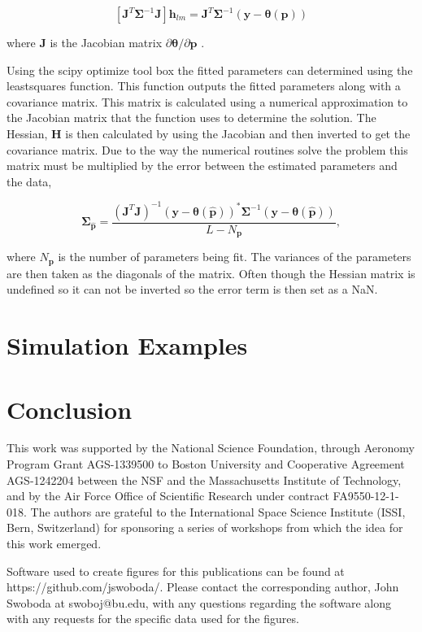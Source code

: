 \documentclass[draft,ras]{agutex}
\begin{document}
\begin{article}
\begin{equation}
\left[ \mathbf{J}^T\bm{\Sigma}^{-1}\mathbf{J}\right]\mathbf{h}_{lm} =\mathbf{J}^T\bm{\Sigma}^{-1}(\mathbf{y}-\bm{\theta}(\mathbf{p}))
\label{hlm}
\end{equation}

\noindent where $\mathbf{J}$ is the Jacobian matrix $\partial \bm{\theta}/\partial \mathbf{p}$ \citep{levenberg1944,marquardt:1963}. 

Using the scipy optimize tool box the fitted parameters can determined using the leastsquares function. This function outputs the fitted parameters along with a covariance matrix. This matrix is calculated using a numerical approximation to the Jacobian matrix that the function uses to determine the solution. The Hessian, $\mathbf{H}$ is then calculated by using the Jacobian and then inverted to get the covariance matrix. Due to the way the numerical routines solve the problem this matrix must be multiplied by the error between the estimated parameters and the data,

\begin{equation}
\label{eqn:jacinv}
\bm{\Sigma}_{\hat{\mathbf{p}}}=\frac{(\mathbf{J}^T\mathbf{J})^{-1} (\mathbf{y}-\bm{\theta}(\hat{\mathbf{p}}))^*\bm{\Sigma}^{-1}(\mathbf{y}-\bm{\theta}(\hat{\mathbf{p}}))}{L-N_{\mathbf{p}}},
\end{equation}

\noindent where $N_{\mathbf{p}}$ is the number of parameters being fit. The variances of the parameters are then taken as the diagonals of the matrix. Often though the Hessian matrix is undefined so it can not be inverted so the error term is then set as a NaN.


\section{Simulation Examples}

\section{Conclusion}

\begin{acknowledgments}
This work was supported by the National Science Foundation, through Aeronomy Program Grant AGS-1339500 to Boston University and Cooperative Agreement AGS-1242204 between the NSF and the Massachusetts Institute of Technology, and by the Air Force Office of Scientific Research under contract FA9550-12-1-018.   The authors are grateful to the International Space Science Institute (ISSI, Bern, Switzerland) for sponsoring a series of workshops from which the idea for this work emerged. 

Software used to create figures for this publications can be found at https://github.com/jswoboda/. Please contact the corresponding author, John Swoboda at swoboj@bu.edu, with any questions regarding the software along with any requests for the specific data used for the figures. \end{acknowledgments}




\end{article}
\end{document}
